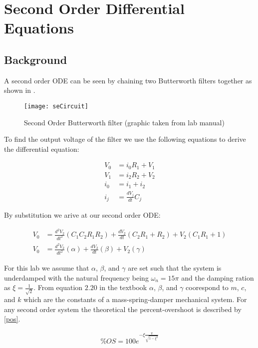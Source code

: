 \documentclass[main.tex]{subfile}
\begin{document}
\section{Second Order Differential Equations}
\label{sec:seAnalaysis}

\subsection{Background}
\label{sec:background}

A second order ODE can be seen by chaining two Butterworth filters together as
shown in .

\begin{figure}[H]
	\begin{center}
		\texttt{[image: seCircuit]}
	\end{center}
	\caption{Second Order Butterworth filter (graphic taken from lab manual)}
	\label{fig:seCircuit}
\end{figure}

To find the output voltage of the filter we use the following equations to
derive the differential equation:

\begin{align*}
	V_0 &= i_0R_1 + V_1
	\\V_1 &= i_2R_2 + V_2
	\\i_0 &= i_1 + i_2
	\\i_j &= \frac{dV_j}{dt}C_j
\end{align*}

By substitution we arive at our second order ODE:

\begin{align}
	V_0 &= \frac{d^2V_2}{dt^2}(C_1C_2R_1R_2) + \frac{dV_2}{dt}(C_2R_1 + R_2) + V_2(C_1R_1 + 1)
	\\V_0 &= \frac{d^2V_2}{dt^2}(\alpha) + \frac{dV_2}{dt}(\beta) + V_2(\gamma)
\end{align}

For this lab we assume that $\alpha$, $\beta$, and $\gamma$ are set such that
the system is underdamped with the natural frequency being $\omega_n = 15\pi$
and the damping ration as $\xi = \frac{1}{\sqrt{2}}$. From equation $2.20$ in
the textbook $\alpha$, $\beta$, and $\gamma$ coorespond to $m$, $c$, and $k$
which are the constants of a mass-spring-damper mechanical system. For any
second order system the theoretical the percent-overshoot is described by
\eqref{pos}.

\begin{align}
	\%OS = 100 e^{-\xi \frac{\pi}{\sqrt{1-\xi^2}}} \label{eq:pos}
\end{align}
\end{document}
